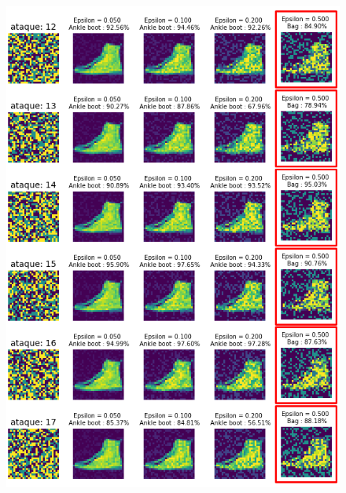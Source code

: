 \begin{figure}[!h]
    \centering
    \includegraphics[scale = 0.85]{Figures/figura_67_3.PNG}
    \label{fig:67_3}
\end{figure}

